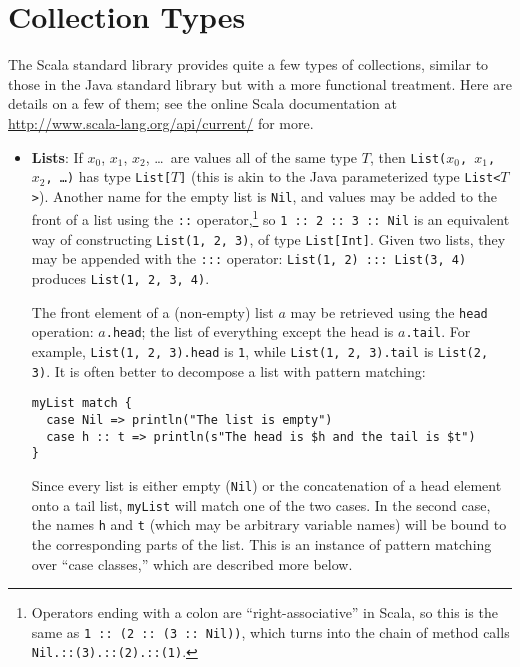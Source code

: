 \section{Collection Types}
The Scala standard library provides quite a few types of collections, similar to those in the Java standard library but with a more functional treatment. Here are details on a few of them; see the online Scala documentation at \url{http://www.scala-lang.org/api/current/} for more.
\begin{itemize}
\item \textbf{Lists}: If $x_0$, $x_1$, $x_2$, \ldots\ are values all of the same type $T$, then \texttt{List($x_0$, $x_1$, $x_2$, \ldots)} has type \texttt{List[$T$]} (this is akin to the Java parameterized type \texttt{List<$T$>}). Another name for the empty list is \texttt{Nil}, and values may be added to the front of a list using the \texttt{::} operator,\footnote{Operators ending with a colon are ``right-associative'' in Scala, so this is the same as \texttt{1 ::\ (2 ::\ (3 ::\ Nil))}, which turns into the chain of method calls \texttt{Nil.::(3).::(2).::(1)}.} so \verb|1 :: 2 :: 3 :: Nil| is an equivalent way of constructing \texttt{List(1, 2, 3)}, of type \texttt{List[Int]}. Given two lists, they may be appended with the \texttt{:::} operator: \verb|List(1, 2) ::: List(3, 4)| produces \verb|List(1, 2, 3, 4)|.

The front element of a (non-empty) list $a$ may be retrieved using the \texttt{head} operation: \texttt{$a$.head}; the list of everything except the head is \texttt{$a$.tail}. For example, \texttt{List(1, 2, 3).head} is \texttt{1}, while \texttt{List(1, 2, 3).tail} is \texttt{List(2, 3)}. It is often better to decompose a list with pattern matching:
\begin{verbatim}
myList match {
  case Nil => println("The list is empty")
  case h :: t => println(s"The head is $h and the tail is $t")
}
\end{verbatim}
Since every list is either empty (\texttt{Nil}) or the concatenation of a head element onto a tail list, \texttt{myList} will match one of the two cases. In the second case, the names \texttt{h} and \texttt{t} (which may be arbitrary variable names) will be bound to the corresponding parts of the list. This is an instance of pattern matching over ``case classes,'' which are described more below.


\end{itemize}
